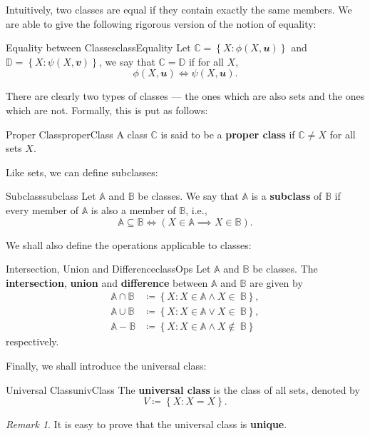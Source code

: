 \documentclass[math]{amznotes}
\theoremstyle{remark}
\newtheorem*{remark}{Remark}
\begin{document}
Intuitively, two classes are equal if they contain exactly the same members. We are able to give the following rigorous version of the notion of equality:
\begin{dfnbox}{Equality between Classes}{classEquality}
    Let $\mathbb{C} = \left\{X \colon \phi(X, \mathbfit{u})\right\}$ and $\mathbb{D} = \left\{X \colon \psi(X, \mathbfit{v})\right\}$, we say that $\mathbb{C} = \mathbb{D}$ if for all $X$,
    \begin{displaymath}
        \phi(X, \mathbfit{u}) \iff \psi(X, \mathbfit{u}).
    \end{displaymath}
\end{dfnbox}
There are clearly two types of classes --- the ones which are also sets and the ones which are not. Formally, this is put as follows:
\begin{dfnbox}{Proper Class}{properClass}
    A class $\mathbb{C}$ is said to be a {\color{red} \textbf{proper class}} if $\mathbb{C} \neq X$ for all sets $X$.
\end{dfnbox}
Like sets, we can define subclasses:
\begin{dfnbox}{Subclass}{subclass}
    Let $\mathbb{A}$ and $\mathbb{B}$ be classes. We say that $\mathbb{A}$ is a {\color{red} \textbf{subclass}} of $\mathbb{B}$ if every member of $\mathbb{A}$ is also a member of $\mathbb{B}$, i.e.,
    \begin{displaymath}
        \mathbb{A} \subseteq \mathbb{B} \iff (X \in \mathbb{A} \implies X \in \mathbb{B}).
    \end{displaymath}
\end{dfnbox}
We shall also define the operations applicable to classes:
\begin{dfnbox}{Intersection, Union and Difference}{classOps}
    Let $\mathbb{A}$ and $\mathbb{B}$ be classes. The {\color{red} \textbf{intersection}}, {\color{red} \textbf{union}} and {\color{red} \textbf{difference}} between $\mathbb{A}$ and $\mathbb{B}$ are given by
    \begin{align*}
        \mathbb{A \cap B} & \coloneqq \left\{X \colon X \in \mathbb{A} \wedge X \in\ \mathbb{B}\right\}, \\
        \mathbb{A \cup B} & \coloneqq \left\{X \colon X \in \mathbb{A} \vee X \in\ \mathbb{B}\right\}, \\
        \mathbb{A - B} & \coloneqq \left\{X \colon X \in \mathbb{A} \wedge X \notin\ \mathbb{B}\right\}
    \end{align*}
    respectively.
\end{dfnbox}
Finally, we shall introduce the universal class:
\begin{dfnbox}{Universal Class}{univClass}
    The {\color{red} \textbf{universal class}} is the class of all sets, denoted by
    \begin{displaymath}
        V \coloneqq \left\{X \colon X = X\right\}.
    \end{displaymath}
\end{dfnbox}
\begin{notebox}
    \begin{remark}
        It is easy to prove that the universal class is \textbf{unique}.
    \end{remark}
\end{notebox}
\end{document}
